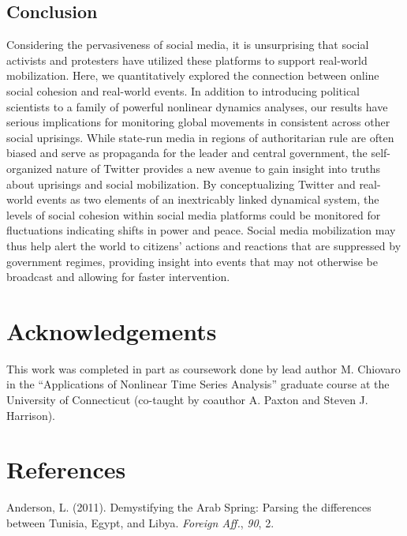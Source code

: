 \documentclass[
  english,
  man]{apa6}
\begin{document}
\hypertarget{conclusion}{%
\subsection{Conclusion}\label{conclusion}}

Considering the pervasiveness of social media, it is unsurprising that social
activists and protesters have utilized these platforms to support real-world
mobilization. Here, we quantitatively explored the connection between online
social cohesion and real-world events. In addition to introducing political
scientists to a family of powerful nonlinear dynamics analyses, our results have
serious implications for monitoring global movements in consistent across other
social uprisings. While state-run media in regions of authoritarian rule are
often biased and serve as propaganda for the leader and central government, the
self-organized nature of Twitter provides a new avenue to gain insight into
truths about uprisings and social mobilization. By conceptualizing Twitter and
real-world events as two elements of an inextricably linked dynamical system,
the levels of social cohesion within social media platforms could be monitored
for fluctuations indicating shifts in power and peace. Social media mobilization
may thus help alert the world to citizens' actions and reactions that are
suppressed by government regimes, providing insight into events that may not
otherwise be broadcast and allowing for faster intervention.

\hypertarget{acknowledgements}{%
\section{Acknowledgements}\label{acknowledgements}}

This work was completed in part as coursework done by lead author M. Chiovaro in
the \enquote{Applications of Nonlinear Time Series Analysis} graduate course at the
University of Connecticut (co-taught by coauthor A. Paxton and Steven J.
Harrison).

\newpage

\hypertarget{references}{%
\section{References}\label{references}}

\begingroup
\setlength{\parindent}{-0.5in}
\setlength{\leftskip}{0.5in}

\hypertarget{refs}{}
\leavevmode\hypertarget{ref-anderson2011demystifying}{}%
Anderson, L. (2011). Demystifying the Arab Spring: Parsing the differences between Tunisia, Egypt, and Libya. \emph{Foreign Aff.}, \emph{90}, 2.
\end{document}
